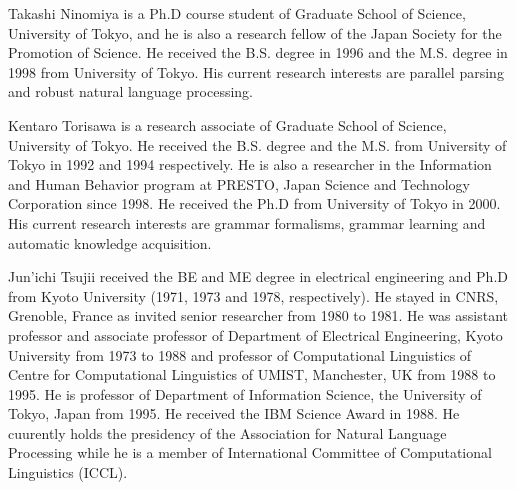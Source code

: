 \begin{biography}

\biotitle{}

 {Takashi Ninomiya is a Ph.D course
student of Graduate School of Science, University of Tokyo, and he is
also a research fellow of the Japan Society for the Promotion of
Science.  He received the B.S. degree in 1996 and the M.S. degree in
1998 from University of Tokyo.  His current research interests are
parallel parsing and robust natural language processing.}

 {Kentaro Torisawa is a research associate
of Graduate School of Science, University of Tokyo. He received the
B.S. degree and the M.S. from University of Tokyo in 1992 and 1994
respectively.  He is also a researcher in the Information and Human
Behavior program at PRESTO, Japan Science and Technology Corporation
since 1998. He received the Ph.D from University of Tokyo in 2000. His
current research interests are grammar formalisms, grammar learning
and automatic knowledge acquisition.}

 {Jun'ichi Tsujii received the BE and ME
degree in electrical engineering and Ph.D from Kyoto University (1971,
1973 and 1978, respectively). He stayed in CNRS, Grenoble, France as
invited senior researcher from 1980 to 1981. He was assistant
professor and associate professor of Department of Electrical
Engineering, Kyoto University from 1973 to 1988 and professor of
Computational Linguistics of Centre for Computational Linguistics of
UMIST, Manchester, UK from 1988 to 1995. He is professor of Department
of Information Science, the University of Tokyo, Japan from 1995. He
received the IBM Science Award in 1988. He cuurently holds the
presidency of the Association for Natural Language Processing while
he is a member of International Committee of Computational
Linguistics (ICCL).}


\end{biography}



